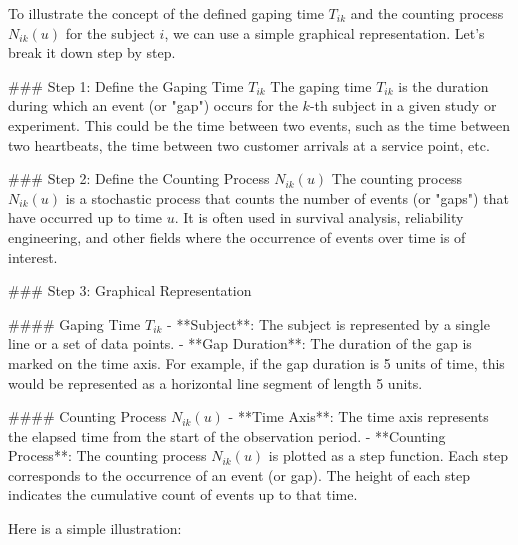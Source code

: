 To illustrate the concept of the defined gaping time \( T_{ik} \) and the counting process \( N_{ik}(u) \) for the subject \( i \), we can use a simple graphical representation. Let's break it down step by step.

### Step 1: Define the Gaping Time \( T_{ik} \)
The gaping time \( T_{ik} \) is the duration during which an event (or "gap") occurs for the \( k \)-th subject in a given study or experiment. This could be the time between two events, such as the time between two heartbeats, the time between two customer arrivals at a service point, etc.

### Step 2: Define the Counting Process \( N_{ik}(u) \)
The counting process \( N_{ik}(u) \) is a stochastic process that counts the number of events (or "gaps") that have occurred up to time \( u \). It is often used in survival analysis, reliability engineering, and other fields where the occurrence of events over time is of interest.

### Step 3: Graphical Representation

#### Gaping Time \( T_{ik} \)
- **Subject**: The subject is represented by a single line or a set of data points.
- **Gap Duration**: The duration of the gap is marked on the time axis. For example, if the gap duration is 5 units of time, this would be represented as a horizontal line segment of length 5 units.

#### Counting Process \( N_{ik}(u) \)
- **Time Axis**: The time axis represents the elapsed time from the start of the observation period.
- **Counting Process**: The counting process \( N_{ik}(u) \) is plotted as a step function. Each step corresponds to the occurrence of an event (or gap). The height of each step indicates the cumulative count of events up to that time.

Here is a simple illustration:

